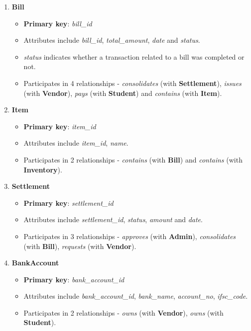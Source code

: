 \documentclass[a4paper,12pt]{article}
\begin{document}
\begin{enumerate}
    \item \textbf{Bill}
    \begin{itemize}
        \item \textbf{Primary key}: \textit{bill\_id}
        \item Attributes include \textit{bill\_id}, \textit{total\_amount}, \textit{date} and \textit{status}.
        \item \textit{status} indicates whether a transaction related to a bill was completed or not.
        \item Participates in 4 relationships - \textit{consolidates} (with \textbf{Settlement}), \textit{issues} (with \textbf{Vendor}), \textit{pays} (with \textbf{Student}) and \textit{contains} (with \textbf{Item}).
    \end{itemize}
    
    \item \textbf{Item}
    \begin{itemize}
        \item \textbf{Primary key}: \textit{item\_id}
        \item Attributes include \textit{item\_id}, \textit{name}.
        \item Participates in 2 relationships - \textit{contains} (with \textbf{Bill}) and  \textit{contains} (with \textbf{Inventory}).
    \end{itemize}
    
    \item \textbf{Settlement}
    \begin{itemize}
        \item \textbf{Primary key}: \textit{settlement\_id}
        \item Attributes include \textit{settlement\_id}, \textit{status}, \textit{amount} and \textit{date}.
        \item Participates in 3 relationships - \textit{approves} (with \textbf{Admin}),  \textit{consolidates} (with \textbf{Bill}), \textit{requests} (with \textbf{Vendor}).
    \end{itemize}
    
    \item \textbf{BankAccount}
    \begin{itemize}
        \item \textbf{Primary key}: \textit{bank\_account\_id}
        \item Attributes include \textit{bank\_account\_id}, \textit{bank\_name}, \textit{account\_no}, \textit{ifsc\_code}.
        \item Participates in 2 relationships - \textit{owns} (with \textbf{Vendor}), \textit{owns} (with \textbf{Student}).
    \end{itemize}
    

\end{enumerate}
\end{document}
